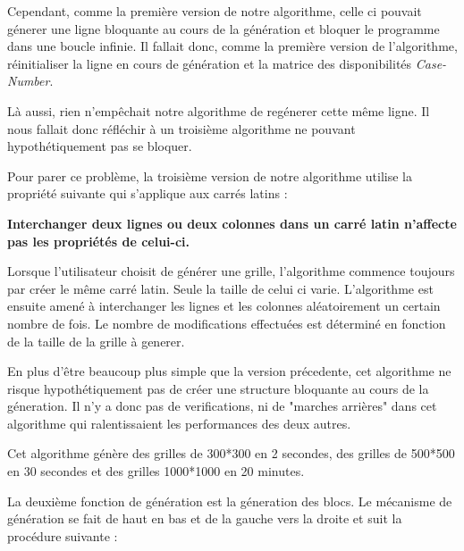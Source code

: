 \documentclass[1]{report}
\begin{document}
\begin{itemize}
            Cependant, comme la première version de notre algorithme, celle ci pouvait génerer une ligne bloquante au cours de la génération et bloquer le programme dans une boucle infinie. Il fallait donc, comme la première version de l'algorithme, réinitialiser la ligne en cours de génération et la matrice des disponibilités \textit{Case-Number}. \newline
            
            Là aussi, rien n'empêchait notre algorithme de regénerer cette même ligne. Il nous fallait donc réfléchir à un troisième algorithme ne pouvant hypothétiquement pas se bloquer. \newline

            Pour parer ce problème, la troisième version de notre algorithme utilise la propriété suivante qui s'applique aux carrés latins : \newline 
            
            \textbf{Interchanger deux lignes ou deux colonnes dans un carré latin n'affecte pas les propriétés de celui-ci.} \newline
            
            Lorsque l'utilisateur choisit de générer une grille, l'algorithme commence toujours par créer le même carré latin. Seule la taille de celui ci varie. L'algorithme est ensuite amené à interchanger les lignes et les colonnes aléatoirement un certain nombre de fois. Le nombre de modifications effectuées est déterminé en fonction de la taille de la grille à generer. \newline
            
            En plus d'être beaucoup plus simple que la version précedente, cet algorithme ne risque hypothétiquement pas de créer une structure bloquante au cours de la géneration. Il n'y a donc pas de verifications, ni de "marches arrières" dans cet algorithme qui ralentissaient les performances des deux autres. \newline
            
            Cet algorithme génère des grilles de 300*300 en 2 secondes, des grilles de 500*500 en 30 secondes et des grilles 1000*1000 en 20 minutes. \newline

            La deuxième fonction de génération est la géneration des blocs. Le mécanisme de génération se fait de haut en bas et de la gauche vers la droite et suit la procédure suivante : \newline
            

\end{itemize}
\end{document}
